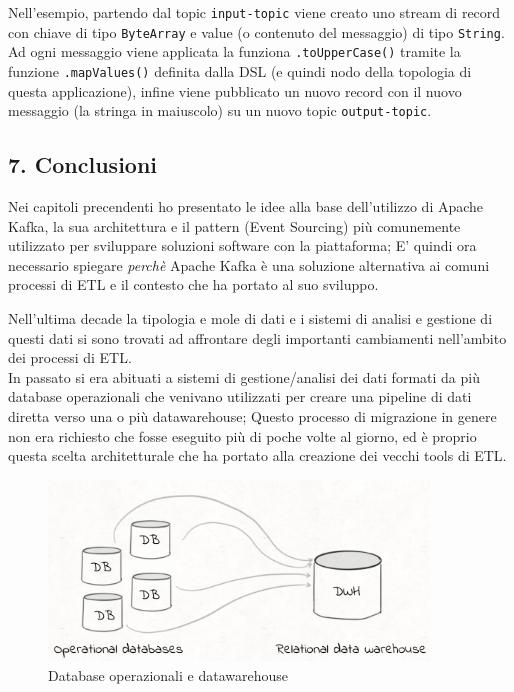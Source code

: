 \documentclass[]{article}
\begin{document}
Nell'esempio, partendo dal topic \texttt{input-topic} viene creato uno
stream di record con chiave di tipo \texttt{ByteArray} e value (o
contenuto del messaggio) di tipo \texttt{String}.\\
Ad ogni messaggio viene applicata la funziona \texttt{.toUpperCase()}
tramite la funzione \texttt{.mapValues()} definita dalla DSL (e quindi
nodo della topologia di questa applicazione), infine viene pubblicato un
nuovo record con il nuovo messaggio (la stringa in maiuscolo) su un
nuovo topic \texttt{output-topic}.

\normalsize

\newpage

\hypertarget{conclusioni}{\subsection{7.
Conclusioni}\label{conclusioni}}

Nei capitoli precendenti ho presentato le idee alla base dell'utilizzo
di Apache Kafka, la sua architettura e il pattern (Event Sourcing) più
comunemente utilizzato per sviluppare soluzioni software con la
piattaforma; E' quindi ora necessario spiegare \emph{perchè} Apache
Kafka è una soluzione alternativa ai comuni processi di ETL e il
contesto che ha portato al suo sviluppo.

Nell'ultima decade la tipologia e mole di dati e i sistemi di analisi e
gestione di questi dati si sono trovati ad affrontare degli importanti
cambiamenti nell'ambito dei processi di ETL.\\
In passato si era abituati a sistemi di gestione/analisi dei dati
formati da più database operazionali che venivano utilizzati per creare
una pipeline di dati diretta verso una o più datawarehouse; Questo
processo di migrazione in genere non era richiesto che fosse eseguito
più di poche volte al giorno, ed è proprio questa scelta architetturale
che ha portato alla creazione dei vecchi tools di ETL.

\begin{figure}
\centering
\includegraphics[width=0.90000\textwidth]{../images/op-dwh.png}
\caption{Database operazionali e datawarehouse \label{figure_5}}
\end{figure}
\end{document}
